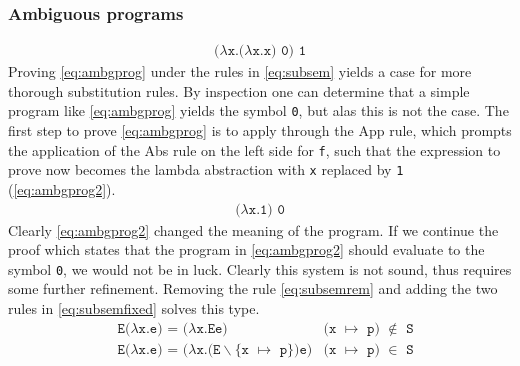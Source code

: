 \subsubsection{Ambiguous programs}
\begin{align}
  \texttt{($\lambda$x.($\lambda$x.x) 0) 1} \label{eq:ambgprog}
\end{align}
Proving \autoref{eq:ambgprog} under the rules in \autoref{eq:subsem} yields a case for more thorough substitution rules.
By inspection one can determine that a simple program like \autoref{eq:ambgprog} yields the symbol \texttt{0}, but alas this is not the case.
The first step to prove \autoref{eq:ambgprog} is to apply through the App rule, which prompts the application of the Abs rule on the left side for \texttt{f}, such that the expression to prove now becomes the lambda abstraction with \texttt{x} replaced by \texttt{1} (\autoref{eq:ambgprog2}).
\begin{align}
  \texttt{($\lambda$x.1) 0} \label{eq:ambgprog2}
\end{align}
Clearly \autoref{eq:ambgprog2} changed the meaning of the program.
If we continue the proof which states that the program in \autoref{eq:ambgprog2} should evaluate to the symbol \texttt{0}, we would not be in luck.
Clearly this system is not sound, thus requires some further refinement.
Removing the rule \autoref{eq:subsemrem} and adding the two rules in \autoref{eq:subsemfixed} solves this type.
\begin{align}
  &\texttt{E($\lambda$x.e) = ($\lambda$x.Ee)} & \texttt{(x $\mapsto$ p) $\notin$ S} \label{eq:subsemfixed}\\
  &\texttt{E($\lambda$x.e) = ($\lambda$x.(E$\backslash$\{x $\mapsto$ p\})e)} & \texttt{(x $\mapsto$ p) $\in$ S} \tag*{}
\end{align}
